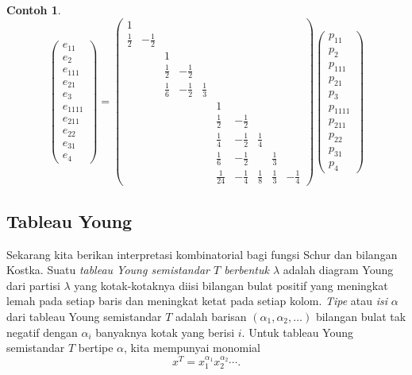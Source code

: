 \documentclass[12pt]{article}
\theoremstyle{plain}
\theoremstyle{definition}
\newtheorem{example}[theorem]{Contoh}
\theoremstyle{remark}
\numberwithin{equation}{section}
\begin{document}
\begin{example}
\[
\begin{pmatrix} e_{11}\\ e_2\\ e_{111}\\ e_{21}\\ e_3\\
e_{1111}\\ e_{211} \\ e_{22}\\ e_{31}\\ e_4
\end{pmatrix}
=
\begin{pmatrix}
1 & &
 & & &
& & & & \\
\frac{1}{2} & -\frac{1}{2} &
 & & &
& & & & \\
 & &
1 & & &
& & & & \\
 & &
\frac{1}{2} & -\frac{1}{2} &  &
& & & & \\
 & &
\frac{1}{6} & -\frac{1}{2} & \frac{1}{3} &
& & & & \\
 & &
 & & &
1 & & & & \\
 & &
 & & &
\frac{1}{2} & -\frac{1}{2} & & & \\
 & &
 & & &
\frac{1}{4} & -\frac{1}{2} & \frac{1}{4} & & \\
 & &
 & & &
\frac{1}{6} & -\frac{1}{2} & & \frac{1}{3} & \\
 & &
 & & &
\frac{1}{24} & -\frac{1}{4} & \frac{1}{8} & \frac{1}{3} & -\frac{1}{4}
\end{pmatrix} 
\begin{pmatrix}
p_{11}\\ p_2\\ p_{111}\\ p_{21}\\ p_3\\
p_{1111}\\ p_{211} \\ p_{22}\\ p_{31}\\ p_4
\end{pmatrix}
\]


\end{example}
\subsection{Tableau Young}
Sekarang kita berikan interpretasi kombinatorial bagi fungsi Schur
dan bilangan Kostka.
Suatu \emph{tableau Young semistandar $T$ berbentuk $\lambda$}
adalah diagram Young dari partisi $\lambda$ yang kotak-kotaknya diisi
bilangan bulat positif yang meningkat lemah pada setiap baris
dan meningkat ketat pada setiap kolom.
\emph{Tipe} atau \emph{isi} $\alpha$ dari tableau Young semistandar
$T$ adalah barisan
$(\alpha_1,\alpha_2,\ldots)$ bilangan bulat tak negatif
dengan $\alpha_i$ banyaknya kotak yang berisi $i$.
Untuk tableau Young semistandar $T$ bertipe $\alpha$,
kita mempunyai monomial
\[
x^T = x_1^{\alpha_1}x_2^{\alpha_2} \cdots .
\]
\end{document}

